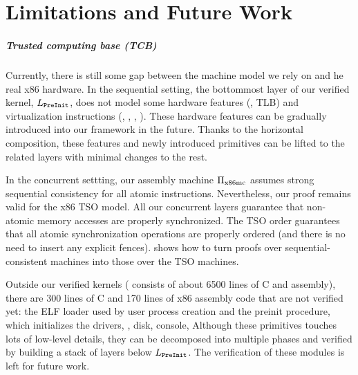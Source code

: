 \chapter{Limitations and Future Work}
\label{chap-limits}



\paragraph{Trusted computing base (TCB)}
Currently, there is still some gap between the machine model we rely on and he real x86 hardware.
In the sequential setting,
the bottommost layer of our
verified kernel, {$L_{\texttt{PreInit}}$}, does not model
some  hardware features (\eg, TLB) and virtualization
instructions (\eg, , , ). 
These hardware features can be gradually introduced into our framework in the future. Thanks to the horizontal composition,
these features and newly introduced primitives can be lifted to the related layers with minimal changes to the rest.

In the concurrent settting,
our assembly machine $\Pi_{\text{x86mc}}$ assumes strong sequential consistency for all
atomic instructions. Nevertheless, our proof remains valid for the x86
TSO model. All our concurrent layers guarantee that non-atomic memory
accesses are properly synchronized.  The TSO order guarantees that all
atomic synchronization operations are properly ordered (and there is
no need to insert any explicit fences).  \citet{vontessin13} shows how
to turn proofs over sequential-consistent machines into those over
the TSO machines.

Outside our verified kernels
(\cCTOS{} consists of about 6500 lines of C and assembly), there
are 300 lines of C and 170 lines of x86 assembly code that are not
verified yet: the ELF loader used by user
process creation
and the preinit procedure, which initializes the drivers, \eg,
disk, console, {\etc}
Although these primitives touches lots of low-level details,
they can be decomposed into multiple phases and verified by building 
a stack of layers below $L_{\texttt{PreInit}}$.
The verification of these modules 
is left for future work. 

